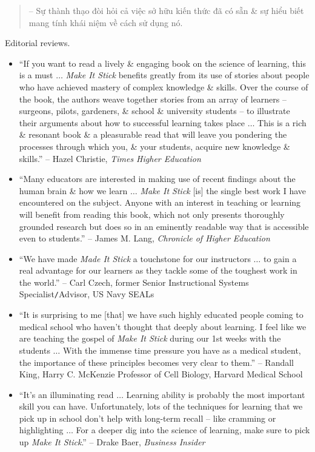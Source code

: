 \documentclass{article}
\begin{document}
\begin{enumerate}
\begin{quotation}
		-- Sự thành thạo đòi hỏi cả việc sở hữu kiến thức đã có sẵn \& sự hiểu biết mang tính khái niệm về cách sử dụng nó.
	\end{quotation}
	{\sf Editorial reviews.}
	\begin{itemize}
		\item ``If you want to read a lively \& engaging book on the science of learning, this is a must $\ldots$ {\it Make It Stick} benefits greatly from its use of stories about people who have achieved mastery of complex knowledge \& skills. Over the course of the book, the authors weave together stories from an array of learners -- surgeons, pilots, gardeners, \& school \& university students -- to illustrate their arguments about how to successful learning takes place $\ldots$ This is a rich \& resonant book \& a pleasurable read that will leave you pondering the processes through which you, \& your students, acquire new knowledge \& skills.'' -- {\sc Hazel Christie}, {\it Times Higher Education}
		\item ``Many educators are interested in making use of recent findings about the human brain \& how we learn $\ldots$ {\it Make It Stick} [is] the single best work I have encountered on the subject. Anyone with an interest in teaching or learning will benefit from reading this book, which not only presents thoroughly grounded research but does so in an eminently readable way that is accessible even to students.'' -- {\sc James M. Lang}, {\it Chronicle of Higher Education}
		\item ``We have made {\it Made It Stick} a touchstone for our instructors $\ldots$ to gain a real advantage for our learners as they tackle some of the toughest work in the world.'' -- {\sc Carl Czech}, former Senior Instructional Systems Specialist{\tt/}Advisor, US Navy SEALs
		\item ``It is surprising to me [that] we have such highly educated people coming to medical school who haven't thought that deeply about learning. I feel like we are teaching the gospel of {\it Make It Stick} during our 1st weeks with the students $\ldots$ With the immense time pressure you have as a medical student, the importance of these principles becomes very clear to them.'' -- {\sc Randall King}, Harry C. McKenzie Professor of Cell Biology, Harvard Medical School
		\item ``It's an illuminating read $\ldots$ Learning ability is probably the most important skill you can have. Unfortunately, lots of the techniques for learning that we pick up in school don't help with long-term recall -- like cramming or highlighting $\ldots$ For a deeper dig into the science of learning, make sure to pick up {\it Make It Stick}.'' -- {\sc Drake Baer}, {\it Business Insider}

\end{itemize}
\end{enumerate}
\end{document}
